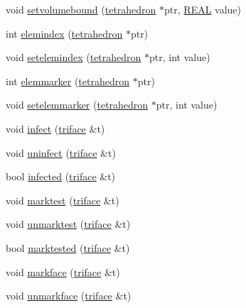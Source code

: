 \begin{DoxyCompactItemize}
\item 
void \hyperlink{classtetgenmesh_a33453f3a5320ecc48f25630a97c5e353}{setvolumebound} (\hyperlink{classtetgenmesh_a6a12b1c0d1834ca941d16c62e949e5e3}{tetrahedron} $\ast$ptr, \hyperlink{tetgen_8h_a4b654506f18b8bfd61ad2a29a7e38c25}{R\-E\-A\-L} value)
\item 
int \hyperlink{classtetgenmesh_a0a12e21d9d363bc5aef59c1b1e51e5f2}{elemindex} (\hyperlink{classtetgenmesh_a6a12b1c0d1834ca941d16c62e949e5e3}{tetrahedron} $\ast$ptr)
\item 
void \hyperlink{classtetgenmesh_a2cbb9d3c9692a5769ad8e9f20263a3ad}{setelemindex} (\hyperlink{classtetgenmesh_a6a12b1c0d1834ca941d16c62e949e5e3}{tetrahedron} $\ast$ptr, int value)
\item 
int \hyperlink{classtetgenmesh_aea9c7e2e0f281f543c9215dcf4694512}{elemmarker} (\hyperlink{classtetgenmesh_a6a12b1c0d1834ca941d16c62e949e5e3}{tetrahedron} $\ast$ptr)
\item 
void \hyperlink{classtetgenmesh_acb8c694d2d20e494b14b9c9f520cd5c8}{setelemmarker} (\hyperlink{classtetgenmesh_a6a12b1c0d1834ca941d16c62e949e5e3}{tetrahedron} $\ast$ptr, int value)
\item 
void \hyperlink{classtetgenmesh_ad060b1bbcd6b0ce11367b1a4d1be9c75}{infect} (\hyperlink{classtetgenmesh_1_1triface}{triface} \&t)
\item 
void \hyperlink{classtetgenmesh_a3de3aa0353d41c28437b3a77cc9618f8}{uninfect} (\hyperlink{classtetgenmesh_1_1triface}{triface} \&t)
\item 
bool \hyperlink{classtetgenmesh_a26ecd46a8e767042b2bd0a2725ac4a89}{infected} (\hyperlink{classtetgenmesh_1_1triface}{triface} \&t)
\item 
void \hyperlink{classtetgenmesh_a4bf3c95209d98d077cf1d9f23940e897}{marktest} (\hyperlink{classtetgenmesh_1_1triface}{triface} \&t)
\item 
void \hyperlink{classtetgenmesh_ad71dabbbfe63203a68adfe3243e2ce05}{unmarktest} (\hyperlink{classtetgenmesh_1_1triface}{triface} \&t)
\item 
bool \hyperlink{classtetgenmesh_a41b5cf3c9d9eec904982f85cf5651f9a}{marktested} (\hyperlink{classtetgenmesh_1_1triface}{triface} \&t)
\item 
void \hyperlink{classtetgenmesh_aeeb480b609c1913bf2d45cc889a54c7d}{markface} (\hyperlink{classtetgenmesh_1_1triface}{triface} \&t)
\item 
void \hyperlink{classtetgenmesh_abe7f9ab91e674a04397d8d050a7e7eb6}{unmarkface} (\hyperlink{classtetgenmesh_1_1triface}{triface} \&t)
\item 

\end{DoxyCompactItemize}
